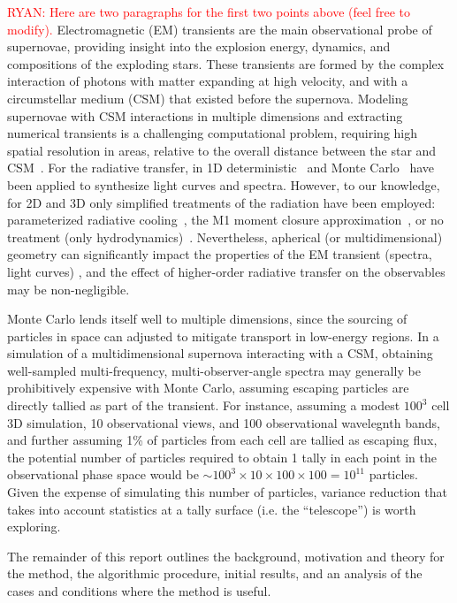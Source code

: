 \documentclass[]{article}
\begin{document}
  \textcolor{red}{RYAN: Here are two paragraphs for the first two points above (feel free to modify).}
  Electromagnetic (EM) transients are the main observational probe of supernovae, providing insight into the explosion energy, dynamics, and
  compositions of the exploding stars.
  These transients are formed by the complex interaction of photons with matter expanding at high velocity, and with a circumstellar medium
  (CSM) that existed before the supernova.
  Modeling supernovae with CSM interactions in multiple dimensions and extracting numerical transients is a challenging computational problem,
  requiring high spatial resolution in areas, relative to the overall distance between the star and CSM~\cite{MS10,MB13}.
  For the radiative transfer, in 1D deterministic~\cite{MB13} and Monte Carlo~\cite{KW09} have been applied to synthesize light curves and
  spectra.
  However, to our knowledge, for 2D and 3D only simplified treatments of the radiation have been employed: parameterized radiative
  cooling~\cite{MS10,MK12}, the M1 moment closure approximation~\cite{VL16}, or no treatment (only hydrodynamics)~\cite{MP18}.
  Nevertheless, apherical (or multidimensional) geometry can significantly impact the properties of the EM transient (spectra, light curves)
  \cite{VL16,MP18}, and the effect of higher-order radiative transfer on the observables may be non-negligible.

  Monte Carlo lends itself well to multiple dimensions, since the sourcing of particles in space can adjusted to mitigate transport in low-energy
  regions.
  In a simulation of a multidimensional supernova interacting with a CSM, obtaining well-sampled multi-frequency, multi-observer-angle
  spectra may generally be prohibitively expensive with Monte Carlo, assuming escaping particles are directly tallied as part of the transient.
  For instance, assuming a modest $100^3$ cell 3D simulation, 10 observational views, and 100 observational wavelegnth bands, and further assuming
  1\% of particles from each cell are tallied as escaping flux, the potential number of particles required to obtain 1 tally in each point in the
  observational phase space would be $\sim 100^3 \times 10 \times 100 \times 100 = 10^{11}$ particles.
  Given the expense of simulating this number of particles, variance reduction that takes into account statistics at a tally surface
  (i.e. the ``telescope'') is worth exploring.

	The remainder of this report outlines the background, motivation and theory for the method, the algorithmic procedure, initial results, and an analysis of the cases and conditions where the method is useful.
\end{document}

